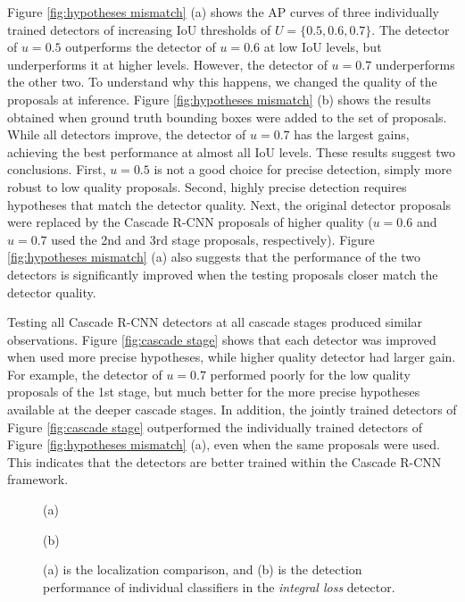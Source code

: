 \documentclass[10pt,twocolumn,letterpaper]{article}
\begin{document}
Figure \ref{fig:hypotheses mismatch} (a) shows the AP curves of three
individually trained detectors of increasing IoU thresholds of
$U=\{0.5,0.6,0.7\}$. The detector of $u=0.5$ outperforms the detector
of $u=0.6$ at low IoU levels, but underperforms it at higher levels.
However, the detector of $u=0.7$ underperforms the other two.
To understand why this happens, we changed the quality of the proposals
at inference. Figure \ref{fig:hypotheses mismatch} (b)
shows the results obtained when ground truth bounding boxes were added to
the set of proposals. While all detectors improve, the detector of $u=0.7$
has the largest gains, achieving the best performance at almost all
IoU levels. These results suggest two conclusions. First, $u=0.5$ is not a
good choice for precise detection, simply more robust to low quality
proposals. Second, highly precise detection requires hypotheses that match
the detector quality. Next, the original detector proposals were replaced by the
Cascade R-CNN proposals of higher quality ($u=0.6$ and $u=0.7$ used the 2nd
and 3rd stage proposals, respectively). Figure \ref{fig:hypotheses mismatch} (a)
also suggests that the performance of the two detectors is significantly
improved when the testing proposals closer match the detector quality.

Testing all Cascade R-CNN detectors at all cascade stages produced
similar observations. Figure \ref{fig:cascade stage} shows that each detector was improved when used more precise hypotheses, while higher quality detector had larger gain. For example, the detector
of $u=0.7$ performed poorly for the low quality proposals of the 1st stage,
but much better for the more precise hypotheses available at the deeper
cascade stages. In addition, the jointly trained
detectors of Figure \ref{fig:cascade stage} outperformed the individually
trained detectors of Figure \ref{fig:hypotheses mismatch} (a), even
when the same proposals were used. This indicates that the detectors are
better trained within the Cascade R-CNN framework.

\begin{figure}[!t]
\begin{minipage}[b]{.48\linewidth}
\centering
\centerline{}{(a)}
\end{minipage}
\hfill
\begin{minipage}[b]{.48\linewidth}
\centering
\centerline{}{(b)}
\end{minipage}
\caption{(a) is the localization comparison, and (b) is the detection performance of individual classifiers in the \textit{integral loss} detector.}
\label{fig:localization and integral}
\end{figure}
\end{document}
